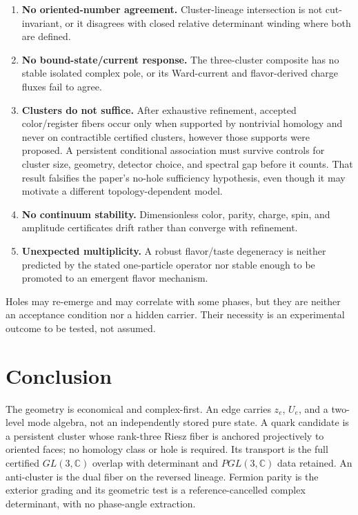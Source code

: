 \documentclass[11pt,letterpaper]{article}
\begin{document}
\begin{enumerate}
  \item \textbf{No oriented-number agreement.} Cluster-lineage intersection
    is not cut-invariant, or it disagrees with closed relative determinant
    winding where both are defined.
  \item \textbf{No bound-state/current response.} The three-cluster composite
    has no stable isolated complex pole, or its Ward-current and
    flavor-derived charge fluxes fail to agree.
  \item \textbf{Clusters do not suffice.} After exhaustive refinement,
    accepted color/register fibers occur only when supported by nontrivial
    homology and never on contractible certified clusters, however those
    supports were proposed. A persistent conditional association must survive
    controls for cluster size, geometry, detector choice, and spectral gap
    before it counts. That result
    falsifies the paper's no-hole sufficiency hypothesis, even though it may
    motivate a different topology-dependent model.
  \item \textbf{No continuum stability.} Dimensionless color, parity, charge,
    spin, and amplitude certificates drift rather than converge with
    refinement.
  \item \textbf{Unexpected multiplicity.} A robust flavor/taste degeneracy is
    neither predicted by the stated one-particle operator nor stable enough to
    be promoted to an emergent flavor mechanism.
\end{enumerate}

Holes may re-emerge and may correlate with some phases, but they are neither an
acceptance condition nor a hidden carrier. Their necessity is an experimental
outcome to be tested, not assumed.

\section{Conclusion}\label{sec:conclusion}

The geometry is economical and complex-first. An edge carries $z_e$, $U_e$,
and a two-level mode algebra, not an independently stored pure state. A quark
candidate is a persistent cluster whose rank-three Riesz fiber is anchored
projectively to oriented faces; no homology class or hole is required. Its
transport is the full certified $GL(3,\mathbb C)$ overlap with determinant and
$PGL(3,\mathbb C)$ data retained. An anti-cluster is the dual fiber on the
reversed lineage. Fermion parity is the exterior grading and its geometric
test is a reference-cancelled complex determinant, with no phase-angle
extraction.
\end{document}
